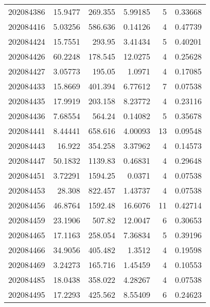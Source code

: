 \begin{tabular}{rrrrrr}
 202084386 &         15.9477  &      269.355  &            5.99185 &           5 & 0.33668 \\
 202084416 &          5.03256 &      586.636  &            0.14126 &           4 & 0.47739 \\
 202084424 &         15.7551  &      293.95   &            3.41434 &           5 & 0.40201 \\
 202084426 &         60.2248  &      178.545  &           12.0275  &           4 & 0.25628 \\
 202084427 &          3.05773 &      195.05   &            1.0971  &           4 & 0.17085 \\
 202084433 &         15.8669  &      401.394  &            6.77612 &           7 & 0.07538 \\
 202084435 &         17.9919  &      203.158  &            8.23772 &           4 & 0.23116 \\
 202084436 &          7.68554 &      564.24   &            0.14082 &           5 & 0.35678 \\
 202084441 &          8.44441 &      658.616  &            4.00093 &          13 & 0.09548 \\
 202084443 &         16.922   &      354.258  &            3.37962 &           4 & 0.14573 \\
 202084447 &         50.1832  &     1139.83   &            0.46831 &           4 & 0.29648 \\
 202084451 &          3.72291 &     1594.25   &            0.0371  &           4 & 0.07538 \\
 202084453 &         28.308   &      822.457  &            1.43737 &           4 & 0.07538 \\
 202084456 &         46.8764  &     1592.48   &           16.6076  &          11 & 0.42714 \\
 202084459 &         23.1906  &      507.82   &           12.0047  &           6 & 0.30653 \\
 202084465 &         17.1163  &      258.054  &            7.36834 &           5 & 0.39196 \\
 202084466 &         34.9056  &      405.482  &            1.3512  &           4 & 0.19598 \\
 202084469 &          3.24273 &      165.716  &            1.45459 &           4 & 0.10553 \\
 202084485 &         18.0438  &      358.022  &            4.28267 &           4 & 0.07538 \\
 202084495 &         17.2293  &      425.562  &            8.55409 &           6 & 0.24623 \\

\end{tabular}
